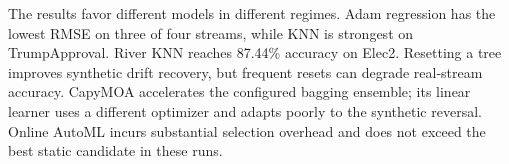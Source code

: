 The results favor different models in different regimes. Adam regression has the lowest RMSE on three of four streams, while KNN is strongest on TrumpApproval. River KNN reaches 87.44\% accuracy on Elec2. Resetting a tree improves synthetic drift recovery, but frequent resets can degrade real-stream accuracy. CapyMOA accelerates the configured bagging ensemble; its linear learner uses a different optimizer and adapts poorly to the synthetic reversal. Online AutoML incurs substantial selection overhead and does not exceed the best static candidate in these runs.
